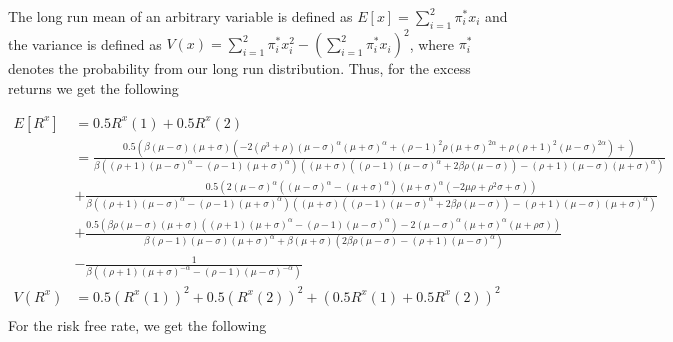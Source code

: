 \documentclass[french]{article}
\begin{document}
\begin{enumerate}[I]
	The long run mean of an arbitrary variable is defined as $E\left[x\right] = \sum_{i=1}^{2}\pi_i^*x_i$ and the variance is defined as $V(x) =  \sum_{i=1}^{2}\pi_i^*x_i^2 - (\sum_{i=1}^{2}\pi_i^*x_i)^2$, where $\pi_i^*$ denotes the probability from our long run distribution. Thus, for the excess returns we get the following
	
	\begin{equation*}
	\begin{split}
		E\left[R^x\right] &= 0.5 R^x(1) + 0.5 R^x(2)\\
		&= \frac{0.5 \left(\beta  (\mu -\sigma ) (\mu +\sigma )
			\left(-2 \left(\rho ^3+\rho \right) (\mu -\sigma
			)^{\alpha } (\mu +\sigma )^{\alpha }+(\rho -1)^2
			\rho  (\mu +\sigma )^{2 \alpha }+\rho  (\rho +1)^2
			(\mu -\sigma )^{2 \alpha }\right)+\right)}{\beta  \left((\rho +1) (\mu -\sigma
			)^{\alpha }-(\rho -1) (\mu +\sigma )^{\alpha
			}\right) \left((\mu +\sigma ) \left((\rho -1) (\mu
			-\sigma )^{\alpha }+2 \beta  \rho  (\mu -\sigma
			)\right)-(\rho +1) (\mu -\sigma ) (\mu +\sigma
			)^{\alpha }\right)}\\
			&+ \frac{0.5 \left(
			2 (\mu -\sigma
			)^{\alpha } \left((\mu -\sigma )^{\alpha }-(\mu
			+\sigma )^{\alpha }\right) (\mu +\sigma )^{\alpha }
			\left(-2 \mu  \rho +\rho ^2 \sigma +\sigma
			\right)\right)}{\beta  \left((\rho +1) (\mu -\sigma
			)^{\alpha }-(\rho -1) (\mu +\sigma )^{\alpha
			}\right) \left((\mu +\sigma ) \left((\rho -1) (\mu
			-\sigma )^{\alpha }+2 \beta  \rho  (\mu -\sigma
			)\right)-(\rho +1) (\mu -\sigma ) (\mu +\sigma
			)^{\alpha }\right)}\\
		&+\frac{0.5 \left(\beta  \rho 
			(\mu -\sigma ) (\mu +\sigma ) \left((\rho +1) (\mu
			+\sigma )^{\alpha }-(\rho -1) (\mu -\sigma
			)^{\alpha }\right)-2 (\mu -\sigma )^{\alpha } (\mu
			+\sigma )^{\alpha } (\mu +\rho  \sigma
			)\right)}{\beta  (\rho -1) (\mu -\sigma ) (\mu
			+\sigma )^{\alpha }+\beta  (\mu +\sigma ) \left(2
			\beta  \rho  (\mu -\sigma )-(\rho +1) (\mu -\sigma
			)^{\alpha }\right)}\\
		&-\frac{1}{\beta  \left((\rho
			+1) (\mu +\sigma )^{-\alpha }-(\rho -1) (\mu
			-\sigma )^{-\alpha }\right)}\\
		V(R^x) &=  0.5 (R^x(1))^2 + 0.5 (R^x(2))^2 +  (0.5 R^x(1) + 0.5 R^x(2))^2\\
	\end{split}
	\end{equation*}
   For the risk free rate, we get the following
   	\begin{equation*}
	   \begin{split}

\end{split}
\end{equation*}
\end{enumerate}
\end{document}
